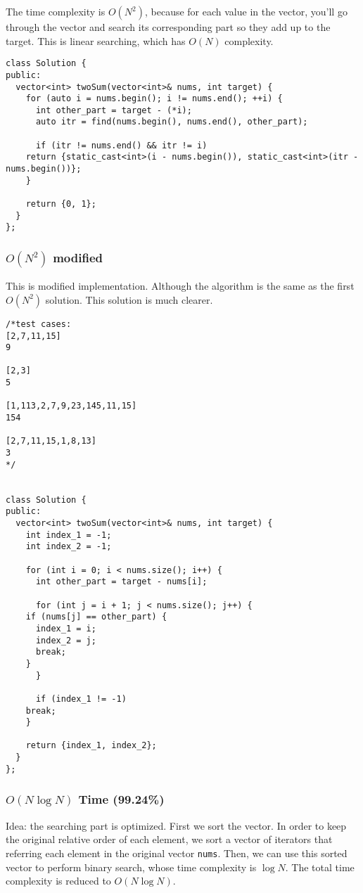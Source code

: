 \documentclass[12pt]{book}
\begin{document}
The time complexity is \(O(N^2)\), because for each value in the vector, you'll go through the vector and search its corresponding part so they add up to the target. This is linear searching, which has \(O(N)\) complexity.
\begin{verbatim}
class Solution {
public:
  vector<int> twoSum(vector<int>& nums, int target) {
    for (auto i = nums.begin(); i != nums.end(); ++i) {
      int other_part = target - (*i);
      auto itr = find(nums.begin(), nums.end(), other_part);

      if (itr != nums.end() && itr != i)
	return {static_cast<int>(i - nums.begin()), static_cast<int>(itr - nums.begin())};
    }

    return {0, 1};
  }
};
\end{verbatim}
\subsubsection{\(O(N^2)\) modified}
\label{sec:org6b7617c}
This is modified implementation. Although the algorithm is the same as the first \(O(N^2)\) solution. This solution is much clearer.
\begin{verbatim}
/*test cases: 
[2,7,11,15]
9

[2,3]
5

[1,113,2,7,9,23,145,11,15]
154

[2,7,11,15,1,8,13]
3
*/


class Solution {
public:
  vector<int> twoSum(vector<int>& nums, int target) {
    int index_1 = -1;
    int index_2 = -1;

    for (int i = 0; i < nums.size(); i++) {
      int other_part = target - nums[i];

      for (int j = i + 1; j < nums.size(); j++) {
	if (nums[j] == other_part) {
	  index_1 = i;
	  index_2 = j;
	  break;
	}
      }

      if (index_1 != -1)
	break;
    }

    return {index_1, index_2};
  }
};
\end{verbatim}
\subsubsection{\(O(N\log{N})\) Time (99.24\%)}
\label{sec:org0e47730}
Idea: the searching part is optimized. First we sort the vector. In order to keep the original relative order of each element, we sort a vector of iterators that referring each element in the original vector \texttt{nums}. Then, we can use this sorted vector to perform binary search, whose time complexity is \(\log{N}\). The total time complexity is reduced to \(O(N\log{N})\).
\end{document}

